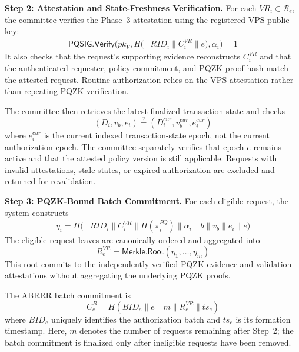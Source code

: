 \documentclass[lettersize,journal]{IEEEtran}
\begin{document}
    \medskip
    \noindent\textbf{Step 2: Attestation and
    State-Freshness Verification.}
    For each $VR_i\in\mathcal{B}_e$, the committee
    verifies the Phase~3 attestation using the
    registered VPS public key:
    \begin{equation}
    \begin{aligned}
    \mathsf{PQSIG.Verify}\big(
    pk_V,
    H(&RID_i\parallel C_i^{VR}\parallel e),
    \alpha_i\big)=1
    \end{aligned}
    \end{equation}
    It also checks that the request's supporting
    evidence reconstructs $C_i^{VR}$ and that the
    authenticated requester, policy commitment,
    and PQZK-proof hash match the attested request.
    Routine authorization relies on the VPS
    attestation rather than repeating PQZK verification.
    
    The committee then retrieves the latest finalized
    transaction state and checks
    \begin{equation}
    (D_i,v_b,e_i)
    \stackrel{?}{=}
    (D_i^{cur},v_b^{cur},e_i^{cur})
    \end{equation}
    where $e_i^{cur}$ is the current indexed
    transaction-state epoch, not the current
    authorization epoch. The committee separately
    verifies that epoch $e$ remains active and that
    the attested policy version is still applicable.
    Requests with invalid attestations, stale states,
    or expired authorization are excluded and
    returned for revalidation.
    
    \medskip
    \noindent\textbf{Step 3: PQZK-Bound Batch Commitment.}
    For each eligible request, the system constructs
    \begin{equation}
    \begin{aligned}
    \eta_i=H\big(&RID_i\parallel C_i^{VR}
    \parallel H(\pi_i^{PQ})\parallel\alpha_i\parallel b
    \parallel v_b\parallel e_i\parallel e\big)
    \end{aligned}
    \end{equation}
    The eligible request leaves are canonically
    ordered and aggregated into
    \begin{equation}
    R_e^{VR}=
    \mathsf{Merkle.Root}
    (\eta_1,\ldots,\eta_m)
    \end{equation}
    This root commits to the independently verified
    PQZK evidence and validation attestations
    without aggregating the underlying PQZK proofs.
    
    The ABRRR batch commitment is
    \begin{equation}
    C_e^{B}=
    H(BID_e\parallel e\parallel m
    \parallel R_e^{VR}\parallel ts_e)
    \end{equation}
    where $BID_e$ uniquely identifies the
    authorization batch and $ts_e$ is its
    formation timestamp. Here, $m$ denotes the
    number of requests remaining after Step~2;
    the batch commitment is finalized only after
    ineligible requests have been removed.
    
\end{document}
